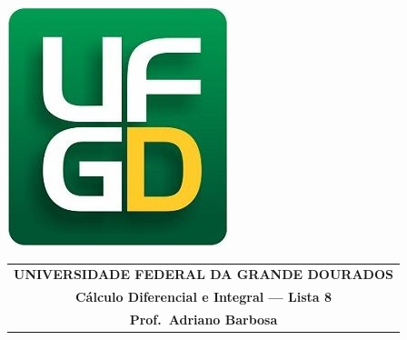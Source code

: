 \documentclass[a4paper,5pt]{amsbook}
\begin{document}
\thispagestyle{empty}
\pagestyle{empty}
\begin{minipage}[h]{0.14\textwidth}
	\includegraphics[scale=0.24]{../ufgd.png}
\end{minipage}
\begin{minipage}[h]{\textwidth}
\begin{tabular}{c}
{{\bf UNIVERSIDADE FEDERAL DA GRANDE DOURADOS}}\\
{{\bf C\'alculo Diferencial e Integral --- Lista 8}}\\
{{\bf Prof.\ Adriano Barbosa}}\\
\end{tabular}
\vspace{-0.45cm}
%
\end{minipage}

\end{document}

